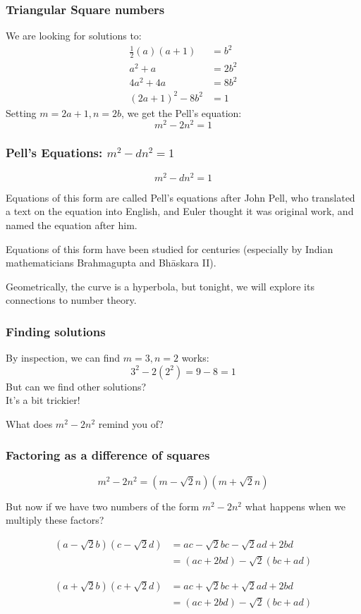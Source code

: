 \documentclass[t]{beamer}
\begin{document}
\begin{frame}
        \frametitle{Triangular Square numbers}
	We are looking for solutions to:
	\begin{align*}
		\frac{1}{2}(a)(a+1) &= b^2 \\
		a^2 + a &= 2b^2 \\
		4a^2 + 4a &= 8b^2 \\
		(2a+1)^2 - 8b^2 &= 1
	\end{align*}
	Setting $m=2a+1, n=2b$, we get the Pell's equation:
	\[ m^2 - 2n^2 = 1 \]
\end{frame}

\begin{frame}
        \frametitle{Pell's Equations: $m^2 - dn^2 = 1$}
	\[ m^2 - dn^2 = 1 \]

	Equations of this form are called Pell's equations after John Pell, who
	translated a text on the equation into English, and Euler thought it was
	original work, and named the equation after him.

	\vspace{1em}Equations of this form have been studied for centuries (especially by
	Indian mathematicians Brahmagupta and Bh\=askara II).

	\vspace{1em}Geometrically, the curve is a hyperbola, but tonight, we will 
	explore its connections to number theory.
\end{frame}


\begin{frame}
	\frametitle{Finding solutions}

	By inspection, we can find $m=3, n=2$ works:
	\[ 3^2 - 2(2^2) = 9 - 8 = 1 \]
	But can we find other solutions?\\
	It's a bit trickier!

	\vspace{2em}

	What does $m^2 - 2n^2$ remind you of?
\end{frame}

\begin{frame}
	\frametitle{Factoring as a difference of squares}

	\[ m^2 - 2n^2 = (m-\sqrt{2}n)(m+\sqrt{2}n) \]

	But now if we have two numbers of the form $m^2-2n^2$ what happens
	when we multiply these factors?

	\begin{align*}
		(a-\sqrt{2}b)(c-\sqrt{2}d) &= ac - \sqrt{2}bc - \sqrt{2}ad + 2bd \\
		&= (ac+2bd)-\sqrt{2}(bc+ad)
	\end{align*}

	\begin{align*}
		(a+\sqrt{2}b)(c+\sqrt{2}d) &= ac + \sqrt{2}bc + \sqrt{2}ad + 2bd \\
		&= (ac+2bd)-\sqrt{2}(bc+ad)
	\end{align*}


\end{frame}
\end{document}
